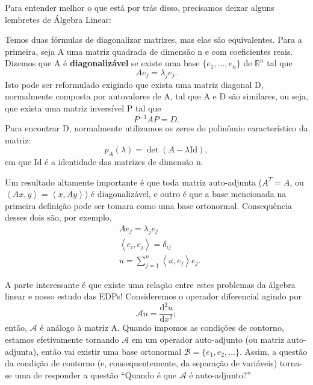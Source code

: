\documentclass[../pde_notes.tex]{subfiles}
\begin{document}
Para entender melhor o que está por trás disso, precisamos deixar alguns lembretes de Álgebra Linear:
\begin{tcolorbox}[
		skin=enhanced,
		title=Lembrete!,
		after title={\hfill Diagonalização de Matrizes},
		fonttitle=\bfseries,
		sharp corners=downhill,
		colframe=black,
		colbacktitle=yellow!75!white,
		colback=yellow!30,
		colbacklower=black,
		coltitle=black,
		drop large lifted shadow
	]
	Temos duas fórmulas de \hypertarget{matrix_diagonalization}{diagonalizar} matrizes, mas elas são equivalentes. Para a primeira, seja A uma matriz quadrada de dimensão n e com coeficientes reais. Dizemos que A é \textbf{diagonalizável} se existe uma base \(\{e_{1}, \dotsc , e_{n}\}\) de \(\mathbb{R}^{n}\) tal que
	\[
		Ae_{j} = \lambda_{j}e_{j}.
	\]
	Isto pode ser reformulado exigindo que exista uma matriz diagonal D, normalmente composta por autovalores de A, tal que A e D são similares, ou seja, que exista uma matriz inversível P tal que
	\[
		P^{-1}AP = D.
	\]
	Para encontrar D, normalmente utilizamos os zeros do polinômio característico da matriz:
	\[
		p_{A}(\lambda ) = \det{(A - \lambda \mathrm{Id})},
	\]
	em que Id é a identidade das matrizes de dimensão n.

	Um resultado altamente importante é que toda matriz auto-adjunta (\(A^{T} = A\), ou \(\left< Ax, y \right> = \left< x, Ay \right>\)) é diagonalizável, e outro é que a base mencionada na primeira definição pode ser tomara como uma base ortonormal. Consequência desses dois são, por exemplo,
	\begin{align*}
		 & Ae_{j} = \lambda_{j}e_{j}                              \\
		 & \left< e_{i}, e_{j} \right> = \delta_{ij}              \\
		 & u = \sum\limits_{j=1}^{n}\left< u, e_{j} \right>e_{j}.
	\end{align*}
\end{tcolorbox}

A parte interessante é que existe uma relação entre estes problemas da álgebra linear e nosso estudo das EDPs! Consideremos o operador diferencial agindo por
\[
	\mathcal{A}u = \frac{\mathrm{d}^{2}u}{\mathrm{d}x^{2}};
\]
então, \(\mathcal{A}\) é análogo à matriz A. Quando impomos as condições de contorno, estamos efetivamente tornando \(\mathcal{A}\) em um operador auto-adjunto (ou matriz auto-adjunta), então vai existir uma base ortonormal \(\mathcal{B} = \{e_{1}, e_{2}, \dotsc \}\). Assim, a questão da condição de contorno (e, consequentemente, da separação de variáveis) torna-se uma de responder a questão ``Quando é que \(\mathcal{A}\) é auto-adjunto?''
\end{document}
